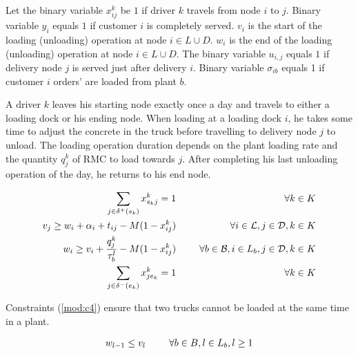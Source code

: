 \documentclass{article}
\begin{document}
Let the binary variable $x^{k}_{ij}$ be $1$ if driver $k$ travels from node $i$ to $j$. Binary variable $y_i$ equals $1$ if customer $i$ is completely served. $v_i$ is the start of the loading (unloading) operation at node $i \in L \cup D$. $w_i$ is the end of the loading (unloading) operation at node $i \in L\cup D$. The binary variable $u_{i,j}$ equals $1$ if delivery node $j$ is served just after delivery $i$.  Binary variable $\sigma_{ib}$ equals 1 if customer $i$ orders' are loaded from plant $b$. %

A driver $k$ leaves his starting node exactly once a day and travels to either a loading dock or his ending node. When loading at a loading dock $i$, he takes some time to adjust the concrete in the truck before travelling to delivery node $j$ to unload. The loading operation duration depends on the plant loading rate and the quantity $q^k_j$ of RMC to load towards $j$. After completing his last unloading operation of the day, he returns to his end node.

\begin{alignat}{3}
\label{mod:c2} \sum_{j \in \delta^{+}(s_k) }{x^k_{s_kj}} = 1 & \text{ } &\forall k \in K \\
\label{mod:c3}   v_j \geq  w_i + \alpha_{i} + t_{ij} - M(1-x^{k}_{ij}) & \text{ }& \forall i \in \mathcal{L}, j \in \mathcal{D},  k \in K \\
\label{mod:c4}  w_{i} \geq v_{i}  + \frac{q^k_j}{\tau^l_b} -M(1- x^{k}_{ij}) &  \hspace{5mm} &\forall  b \in \mathcal{B},  i \in L_{b}, j \in \mathcal{D}, k \in K \\
\label{mod:c5} \sum_{j \in \delta^{-}(e_k)}{x^k_{je_k}} = 1 & \text{ }   &  \forall k \in K
\end{alignat}

Constraints (\ref{mod:c4}) ensure that two trucks cannot be loaded at the same time in a plant.

\begin{alignat}{3}
    \label{mod:c6}       w_{l-1} \leq v_{l} & \hspace{5mm} &\forall  b \in B,  l \in L_{b}, l \geq 1 
\end{alignat}
\end{document}
